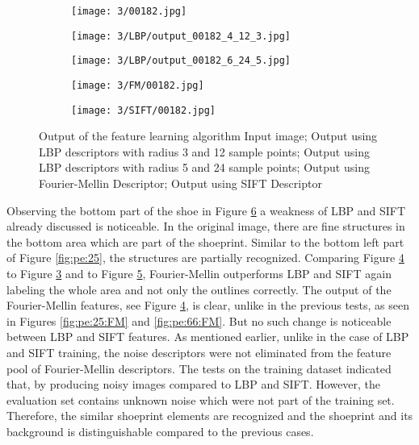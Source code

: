 \documentclass[draft,final]{vutinfth} %
\begin{document}
\begin{figure}[h]
  \centering
  \begin{subfigure}[t]{0.19\columnwidth}
    \centering
    \texttt{[image: 3/00182.jpg]}
    \subcaption{}
    \label{fig:pe:182:orig}
  \end{subfigure}
  \begin{subfigure}[t]{0.19\columnwidth}
    \centering
    \texttt{[image: 3/LBP/output\_00182\_4\_12\_3.jpg]}
    \subcaption{}
    \label{fig:pe:182:LBPs}
  \end{subfigure}
  \begin{subfigure}[t]{0.19\columnwidth}
    \centering
    \texttt{[image: 3/LBP/output\_00182\_6\_24\_5.jpg]}
    \subcaption{}
    \label{fig:pe:182:LBPb}
  \end{subfigure}
  \begin{subfigure}[t]{0.19\columnwidth}
    \centering
    \texttt{[image: 3/FM/00182.jpg]}
    \subcaption{}
    \label{fig:pe:182:FM}
  \end{subfigure}
  \begin{subfigure}[t]{0.19\columnwidth}
    \centering
    \texttt{[image: 3/SIFT/00182.jpg]}
    \subcaption{}
    \label{fig:pe:182:SIFT}
  \end{subfigure}
  \caption{Output of the feature learning algorithm  Input image;  Output using LBP descriptors with radius 3 and 12 sample points;  Output using LBP descriptors with radius 5 and 24 sample points;  Output using Fourier-Mellin Descriptor;  Output using SIFT Descriptor}
  \label{fig:pe:182}
\end{figure}

\par
Observing the bottom part of the shoe in Figure \ref{fig:pe:182} a weakness of LBP and SIFT already discussed is noticeable.
In the original image, there are fine structures in the bottom area which are part of the shoeprint.
Similar to the bottom left part of Figure \ref{fig:pe:25}, the structures are partially recognized.
Comparing Figure \ref{fig:pe:182:FM} to Figure \ref{fig:pe:182:LBPb} and to Figure \ref{fig:pe:182:SIFT}, Fourier-Mellin outperforms LBP and SIFT again labeling the whole area and not only the outlines correctly.
The output of the Fourier-Mellin features, see Figure \ref{fig:pe:182:FM}, is clear, unlike in the previous tests, as seen in Figures \ref{fig:pe:25:FM} and \ref{fig:pe:66:FM}.
But no such change is noticeable between LBP and SIFT features.
As mentioned earlier, unlike in the case of LBP and SIFT training, the noise descriptors were not eliminated from the feature pool of Fourier-Mellin descriptors.
The tests on the training dataset indicated that, by producing noisy images compared to LBP and SIFT.
However, the evaluation set contains unknown noise which were not part of the training set.
Therefore, the similar shoeprint elements are recognized and the shoeprint and its background is distinguishable compared to the previous cases.
\end{document}
